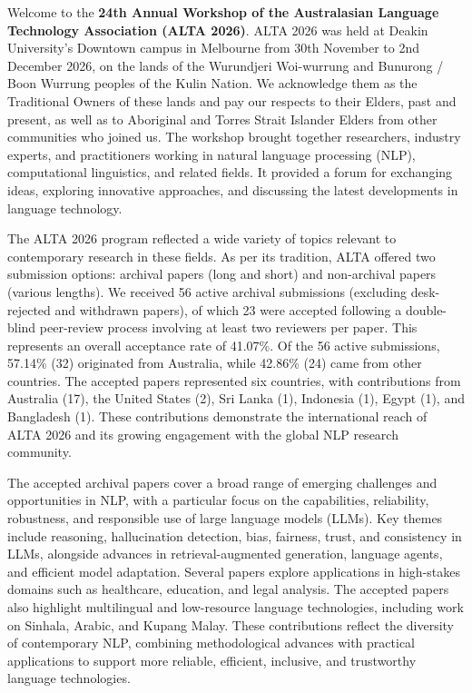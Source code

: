 
Welcome to the \textbf{24th Annual Workshop of the Australasian Language Technology Association (ALTA 2026)}. ALTA 2026 was held at Deakin University's Downtown campus in Melbourne from 30th November to 2nd December 2026, on the lands of the Wurundjeri Woi-wurrung and Bunurong / Boon Wurrung peoples of the Kulin Nation. We acknowledge them as the Traditional Owners of these lands and pay our respects to their Elders, past and present, as well as to Aboriginal and Torres Strait Islander Elders from other communities who joined us. The workshop brought together researchers, industry experts, and practitioners working in natural language processing (NLP), computational linguistics, and related fields. It provided a forum for exchanging ideas, exploring innovative approaches, and discussing the latest developments in language technology. \newline


The ALTA 2026 program reflected a wide variety of topics relevant to contemporary research in these fields. As per its tradition, ALTA offered two submission options: archival papers (long and short) and non-archival papers (various lengths). We received 56 active archival submissions (excluding desk-rejected and withdrawn papers), of which 23 were accepted following a double-blind peer-review process involving at least two reviewers per paper. This represents an overall acceptance rate of 41.07\%. Of the 56 active submissions, 57.14\% (32) originated from Australia, while 42.86\% (24) came from other countries. The accepted papers represented six countries, with contributions from Australia (17), the United States (2), Sri Lanka (1), Indonesia (1), Egypt (1), and Bangladesh (1). These contributions demonstrate the international reach of ALTA 2026 and its growing engagement with the global NLP research community. \newline


The accepted archival papers cover a broad range of emerging challenges and opportunities in NLP, with a particular focus on the capabilities, reliability, robustness, and responsible use of large language models (LLMs). Key themes include reasoning, hallucination detection, bias, fairness, trust, and consistency in LLMs, alongside advances in retrieval-augmented generation, language agents, and efficient model adaptation. Several papers explore applications in high-stakes domains such as healthcare, education, and legal analysis. The accepted papers also highlight multilingual and low-resource language technologies, including work on Sinhala, Arabic, and Kupang Malay. These contributions reflect the diversity of contemporary NLP, combining methodological advances with practical applications to support more reliable, efficient, inclusive, and trustworthy language technologies. \newline


